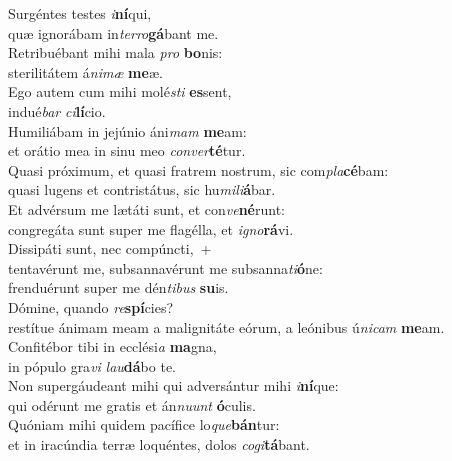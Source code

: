 \oddverse Surgéntes testes \textit{i}\textbf{ní}qui,~\*\\
\oddverse quæ ignorábam in\textit{ter}\textit{ro}\textbf{gá}bant me.\\
\evenverse Retribuébant mihi mala \textit{pro} \textbf{bo}nis:~\*\\
\evenverse sterilitátem á\textit{ni}\textit{mæ} \textbf{me}æ.\\
\oddverse Ego autem cum mihi molé\textit{sti} \textbf{es}sent,~\*\\
\oddverse indué\textit{bar} \textit{ci}\textbf{lí}cio.\\
\evenverse Humiliábam in jejúnio áni\textit{mam} \textbf{me}am:~\*\\
\evenverse et orátio mea in sinu meo \textit{con}\textit{ver}\textbf{té}tur.\\
\oddverse Quasi próximum, et quasi fratrem nostrum, sic com\textit{pla}\textbf{cé}bam:~\*\\
\oddverse quasi lugens et contristátus, sic hu\textit{mi}\textit{li}\textbf{á}bar.\\
\evenverse Et advérsum me lætáti sunt, et con\textit{ve}\textbf{né}runt:~\*\\
\evenverse congregáta sunt super me flagélla, et \textit{i}\textit{gno}\textbf{rá}vi.\\
\oddverse Dissipáti sunt, nec compúncti,~+\\
\oddverse  tentavérunt me, subsannavérunt me subsanna\textit{ti}\textbf{ó}ne:~\*\\
\oddverse frenduérunt super me dén\textit{ti}\textit{bus} \textbf{su}is.\\
\evenverse Dómine, quando \textit{re}\textbf{spí}cies?~\*\\
\evenverse restítue ánimam meam a malignitáte eórum, a leónibus ú\textit{ni}\textit{cam} \textbf{me}am.\\
\oddverse Confitébor tibi in ecclési\textit{a} \textbf{ma}gna,~\*\\
\oddverse in pópulo gra\textit{vi} \textit{lau}\textbf{dá}bo te.\\
\evenverse Non supergáudeant mihi qui adversántur mihi \textit{i}\textbf{ní}que:~\*\\
\evenverse qui odérunt me gratis et án\textit{nu}\textit{unt} \textbf{ó}culis.\\
\oddverse Quóniam mihi quidem pacífice lo\textit{que}\textbf{bán}tur:~\*\\
\oddverse et in iracúndia terræ loquéntes, dolos \textit{co}\textit{gi}\textbf{tá}bant.\\
